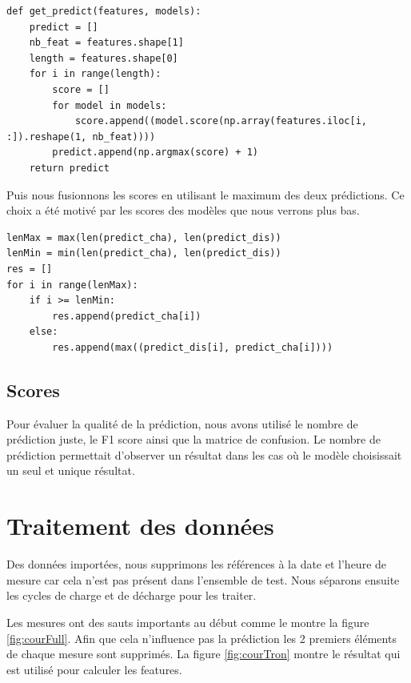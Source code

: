 \begin{verbatim}
def get_predict(features, models):
    predict = []
    nb_feat = features.shape[1]
    length = features.shape[0]
    for i in range(length):
        score = []
        for model in models:
            score.append((model.score(np.array(features.iloc[i, :]).reshape(1, nb_feat))))
        predict.append(np.argmax(score) + 1)
    return predict
\end{verbatim}

Puis nous fusionnons les scores en utilisant le maximum des deux prédictions.
Ce choix a été motivé par les scores des modèles que nous verrons plus bas.

\begin{verbatim}
lenMax = max(len(predict_cha), len(predict_dis))
lenMin = min(len(predict_cha), len(predict_dis))
res = []
for i in range(lenMax):
    if i >= lenMin:
        res.append(predict_cha[i])
    else:
        res.append(max((predict_dis[i], predict_cha[i])))
\end{verbatim}

\subsection{Scores}
Pour évaluer la qualité de la prédiction, nous avons utilisé le nombre de prédiction
juste, le F1 score ainsi que la matrice de confusion. Le nombre de prédiction
permettait d'observer un résultat dans les cas où le modèle choisissait un seul et
unique résultat.

\section{Traitement des données}
Des données importées, nous supprimons les références à la date et l'heure de mesure car cela n'est pas présent dans l'ensemble de test.
Nous séparons ensuite les cycles de charge et de décharge pour les traiter.

Les mesures ont des sauts importants au début comme le montre la figure \ref{fig:courFull}. Afin que cela n'influence pas la prédiction les 2 premiers éléments de chaque mesure sont supprimés. La figure \ref{fig:courTron} montre le résultat qui est utilisé pour calculer les features.

